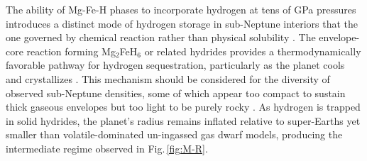 \documentclass[draft,jgrga,12pt]{agujournal2019}
\begin{document}



The ability of Mg-Fe-H phases to incorporate hydrogen at tens of GPa pressures introduces a distinct mode of hydrogen storage in sub-Neptune interiors that the one governed by chemical reaction rather than physical solubility \cite{kim_stability_2023, werlen_subneptunes_2025}. 
The envelope-core reaction forming Mg$_2$FeH$_6$ or related hydrides provides a thermodynamically favorable pathway for hydrogen sequestration, particularly as the planet cools and crystallizes \cite{kim_stability_2023, horn_reaction_2023}. This mechanism should be considered for the diversity of observed sub-Neptune densities, some of which appear too compact to sustain thick gaseous envelopes but too light to be purely rocky \cite{kite_atmosphere_2020, bean_nature_2021}. 
As hydrogen is trapped in solid hydrides, the planet’s radius remains inflated relative to super-Earths yet smaller than volatile-dominated un-ingassed gas dwarf models, producing the intermediate regime observed in Fig.\,\ref{fig:M-R}.

\end{document}
